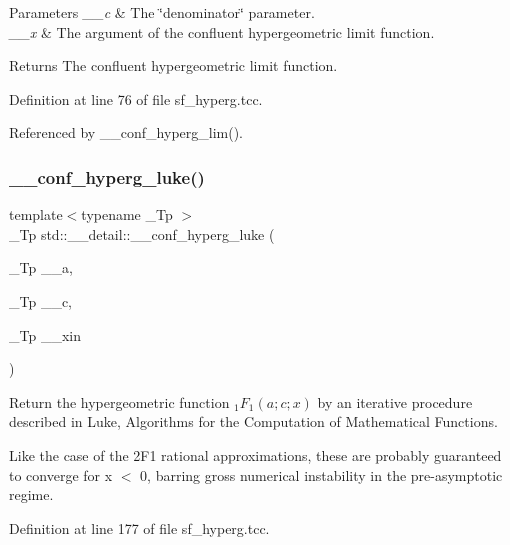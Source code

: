 \begin{DoxyParams}{Parameters}
{\em \+\_\+\+\_\+c} & The \char`\"{}denominator\char`\"{} parameter. \\
\hline
{\em \+\_\+\+\_\+x} & The argument of the confluent hypergeometric limit function. \\
\hline
\end{DoxyParams}
\begin{DoxyReturn}{Returns}
The confluent hypergeometric limit function. 
\end{DoxyReturn}


Definition at line 76 of file sf\+\_\+hyperg.\+tcc.



Referenced by \+\_\+\+\_\+conf\+\_\+hyperg\+\_\+lim().

\mbox{\label{namespacestd_1_1____detail_ac3b4c72998f9d7deb6d79bda93220e58}} 
\subsubsection{\texorpdfstring{\+\_\+\+\_\+conf\+\_\+hyperg\+\_\+luke()}{\_\_conf\_hyperg\_luke()}}
{\footnotesize\ttfamily template$<$typename \+\_\+\+Tp $>$ \\
\+\_\+\+Tp std\+::\+\_\+\+\_\+detail\+::\+\_\+\+\_\+conf\+\_\+hyperg\+\_\+luke (\begin{DoxyParamCaption}\item[{\+\_\+\+Tp}]{\+\_\+\+\_\+a,  }\item[{\+\_\+\+Tp}]{\+\_\+\+\_\+c,  }\item[{\+\_\+\+Tp}]{\+\_\+\+\_\+xin }\end{DoxyParamCaption})}



Return the hypergeometric function $ {}_1F_1(a;c;x) $ by an iterative procedure described in Luke, Algorithms for the Computation of Mathematical Functions. 

Like the case of the 2\+F1 rational approximations, these are probably guaranteed to converge for x $<$ 0, barring gross numerical instability in the pre-\/asymptotic regime. 

Definition at line 177 of file sf\+\_\+hyperg.\+tcc.



